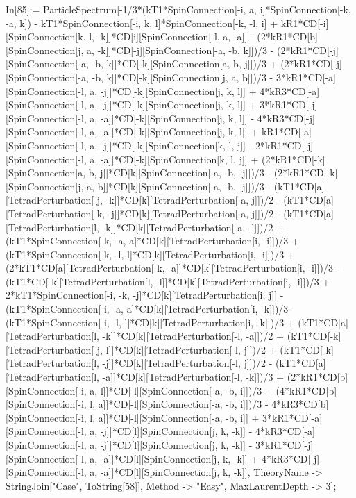 In[85]:= ParticleSpectrum[-1/3*(kT1*SpinConnection[-i, a, i]*SpinConnection[-k, -a, k]) - kT1*SpinConnection[-i, k, l]*SpinConnection[-k, -l, i] + kR1*CD[-i][SpinConnection[k, l, -k]]*CD[i][SpinConnection[-l, a, -a]] - (2*kR1*CD[b][SpinConnection[j, a, -k]]*CD[-j][SpinConnection[-a, -b, k]])/3 - (2*kR1*CD[-j][SpinConnection[-a, -b, k]]*CD[-k][SpinConnection[a, b, j]])/3 + (2*kR1*CD[-j][SpinConnection[-a, -b, k]]*CD[-k][SpinConnection[j, a, b]])/3 - 3*kR1*CD[-a][SpinConnection[-l, a, -j]]*CD[-k][SpinConnection[j, k, l]] + 4*kR3*CD[-a][SpinConnection[-l, a, -j]]*CD[-k][SpinConnection[j, k, l]] + 3*kR1*CD[-j][SpinConnection[-l, a, -a]]*CD[-k][SpinConnection[j, k, l]] - 4*kR3*CD[-j][SpinConnection[-l, a, -a]]*CD[-k][SpinConnection[j, k, l]] + kR1*CD[-a][SpinConnection[-l, a, -j]]*CD[-k][SpinConnection[k, l, j]] - 2*kR1*CD[-j][SpinConnection[-l, a, -a]]*CD[-k][SpinConnection[k, l, j]] + (2*kR1*CD[-k][SpinConnection[a, b, j]]*CD[k][SpinConnection[-a, -b, -j]])/3 - (2*kR1*CD[-k][SpinConnection[j, a, b]]*CD[k][SpinConnection[-a, -b, -j]])/3 - (kT1*CD[a][TetradPerturbation[-j, -k]]*CD[k][TetradPerturbation[-a, j]])/2 - (kT1*CD[a][TetradPerturbation[-k, -j]]*CD[k][TetradPerturbation[-a, j]])/2 - (kT1*CD[a][TetradPerturbation[l, -k]]*CD[k][TetradPerturbation[-a, -l]])/2 + (kT1*SpinConnection[-k, -a, a]*CD[k][TetradPerturbation[i, -i]])/3 + (kT1*SpinConnection[-k, -l, l]*CD[k][TetradPerturbation[i, -i]])/3 + (2*kT1*CD[a][TetradPerturbation[-k, -a]]*CD[k][TetradPerturbation[i, -i]])/3 - (kT1*CD[-k][TetradPerturbation[l, -l]]*CD[k][TetradPerturbation[i, -i]])/3 + 2*kT1*SpinConnection[-i, -k, -j]*CD[k][TetradPerturbation[i, j]] - (kT1*SpinConnection[-i, -a, a]*CD[k][TetradPerturbation[i, -k]])/3 - (kT1*SpinConnection[-i, -l, l]*CD[k][TetradPerturbation[i, -k]])/3 + (kT1*CD[a][TetradPerturbation[l, -k]]*CD[k][TetradPerturbation[-l, -a]])/2 + (kT1*CD[-k][TetradPerturbation[-j, l]]*CD[k][TetradPerturbation[-l, j]])/2 + (kT1*CD[-k][TetradPerturbation[l, -j]]*CD[k][TetradPerturbation[-l, j]])/2 - (kT1*CD[a][TetradPerturbation[l, -a]]*CD[k][TetradPerturbation[-l, -k]])/3 + (2*kR1*CD[b][SpinConnection[-i, a, l]]*CD[-l][SpinConnection[-a, -b, i]])/3 + (4*kR1*CD[b][SpinConnection[-i, l, a]]*CD[-l][SpinConnection[-a, -b, i]])/3 - 4*kR3*CD[b][SpinConnection[-i, l, a]]*CD[-l][SpinConnection[-a, -b, i]] + 3*kR1*CD[-a][SpinConnection[-l, a, -j]]*CD[l][SpinConnection[j, k, -k]] - 4*kR3*CD[-a][SpinConnection[-l, a, -j]]*CD[l][SpinConnection[j, k, -k]] - 3*kR1*CD[-j][SpinConnection[-l, a, -a]]*CD[l][SpinConnection[j, k, -k]] + 4*kR3*CD[-j][SpinConnection[-l, a, -a]]*CD[l][SpinConnection[j, k, -k]], TheoryName -> StringJoin["Case", ToString[58]], Method -> "Easy", MaxLaurentDepth -> 3]; 